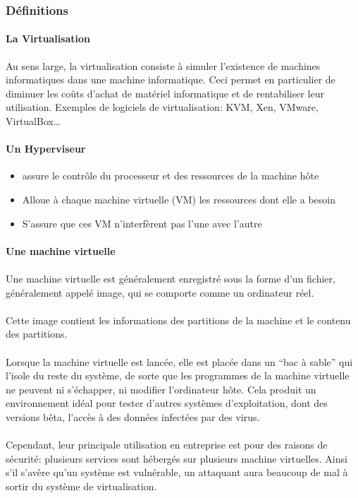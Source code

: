 \subsubsection{Définitions}

\paragraph{La Virtualisation} Au sens large, la virtualisation consiste à
simuler l'existence de machines informatiques dans une machine informatique.
Ceci permet en particulier de diminuer les coûts d'achat de matériel
informatique et de rentabiliser leur utilisation. Exemples de logiciels de
virtualisation: KVM, Xen, VMware, VirtualBox\ldots

\paragraph{Un Hyperviseur}
\begin{itemize}
	\item assure le contrôle du processeur et des ressources de la machine hôte
	\item Alloue à chaque machine virtuelle (VM) les ressources dont elle a besoin
	\item S'assure que ces VM n'interfèrent pas l'une avec l'autre
\end{itemize}

\paragraph{Une machine virtuelle}

\paragraph{} Une machine virtuelle est généralement enregistré sous la forme
d'un fichier, généralement appelé image, qui se comporte comme un ordinateur
réel.

\paragraph{} Cette image contient les informations des partitions de la machine
et le contenu des partitions.

\paragraph{} Lorsque la machine virtuelle est lancée, elle est placée dans un
``bac à sable'' qui l’isole du reste du système, de sorte que les programmes de
la machine virtuelle ne peuvent ni s’échapper, ni modifier l'ordinateur hôte.
Cela produit un environnement idéal pour tester d'autres systèmes
d’exploitation, dont des versions bêta, l’accès à des données infectées par des
virus.

\paragraph{} Cependant, leur principale utilisation en entreprise est pour des
raisons de sécurité: plusieurs services sont hébergés sur plusieurs machine
virtuelles. Ainsi s'il s'avère qu'un système est vulnérable, un attaquant aura
beaucoup de mal à sortir du système de virtualisation.
